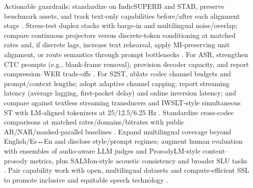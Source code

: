 \documentclass{article}
\begin{document}
Actionable guardrails: standardize on IndicSUPERB and STAB, preserve benchmark assets, and track text‑only capabilities before/after each alignment stage \cite{vashishth2024stabspeechtokenizerassessmentbenchmark,entry2025indicsuperbspeechprocessinguniversalperf}. Stress‑test duplex stacks with barge‑in and multilingual noise/overlap; compare continuous projectors versus discrete‑token conditioning at matched rates and, if discrete lags, increase text rehearsal, apply MI‑preserving unit alignment, or route semantics through prompt bottlenecks \cite{ma2024languagemodelcanlistenwhilespeaking,wang2025bossbeyondsemanticspeech,tsunoo2024decoderonlyarchitecturespeechrecognition}. For ASR, strengthen CTC prompts (e.g., blank‑frame removal), provision decoder capacity, and report compression–WER trade‑offs \cite{tsunoo2024decoderonlyarchitecturespeechrecognition}. For S2ST, ablate codec channel budgets and prompt/context lengths; adopt adaptive channel capping; report streaming latency (average lagging, first‑packet delay) and online inversion latency; and compare against textless streaming transducers and IWSLT‑style simultaneous ST with LM‑aligned tokenizers at 25/12.5/6.25 Hz \cite{peng2024mslms2stmultitaskspeechlanguagemodeltext,jo2025lmsptalignedsemanticdistillationspeechto,ouyang2025cmusiwslt2025simultaneousspeechtranslati,zhao2024textlessstreamingspeechtranslationsemant,sheng2025syncspeechlowlatencyefficientdualstreamt}. Standardize cross‑codec comparisons at matched rates/domains/bitrates with public AR/NAR/masked‑parallel baselines \cite{li2024investigatingneuralaudiocodecsspeechlang}. Expand multilingual coverage beyond English/Es↔En and disclose style/prompt regimes; augment human evaluation with ensembles of audio‑aware LLM judges and ProsodyLM‑style content–prosody metrics, plus SALMon‑style acoustic consistency and broader SLU tasks \cite{qian2025prosodylmuncoveringemergingprosodyproces,chiang2025audioawarelargelanguagemodelsasjudgesspe,maimon2025salmonsuiteacousticlanguagemodelevaluati,entry2025indicsuperbspeechprocessinguniversalperf}. Pair capability work with open, multilingual datasets and compute‑efficient SSL to promote inclusive and equitable speech technology \cite{chen2023reducingbarriersselfsupervisedlearninghu,entry2025indicsuperbspeechprocessinguniversalperf,wang2025bossbeyondsemanticspeech,yang2024buildingtaiwanesemandarinspokenlanguagem,fily2024establishingdegreesclosenessbetweenaudio}.
\end{document}
